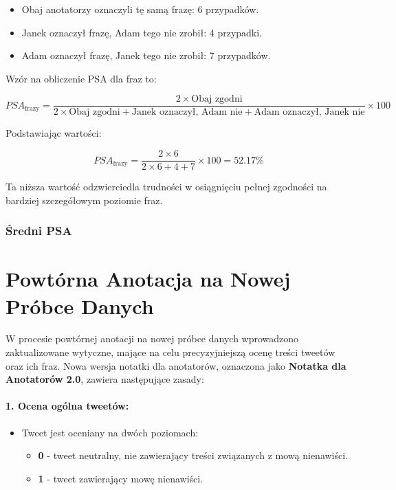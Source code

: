 \documentclass[12pt]{article}
\begin{document}
\begin{itemize}
    \item Obaj anotatorzy oznaczyli tę samą frazę: 6 przypadków.
    \item Janek oznaczył frazę, Adam tego nie zrobił: 4 przypadki.
    \item Adam oznaczył frazę, Janek tego nie zrobił: 7 przypadków.
\end{itemize}

Wzór na obliczenie PSA dla fraz to:

\begin{dmath}
PSA_{\text{frazy}} = \frac{2 \times \text{Obaj zgodni}}{2 \times \text{Obaj zgodni} + \text{Janek oznaczył, Adam nie} + \text{Adam oznaczył, Janek nie}} \times 100
\end{dmath}

Podstawiając wartości:

\begin{dmath}
PSA_{\text{frazy}} = \frac{2 \times 6}{2 \times 6 + 4 + 7} \times 100 = 52.17\%
\end{dmath}

Ta niższa wartość odzwierciedla trudności w osiągnięciu pełnej zgodności na bardziej szczegółowym poziomie fraz.

\subsubsection{Średni PSA}

\section{Powtórna Anotacja na Nowej Próbce Danych}

W procesie powtórnej anotacji na nowej próbce danych wprowadzono zaktualizowane wytyczne, mające na celu precyzyjniejszą ocenę treści tweetów oraz ich fraz. Nowa wersja notatki dla anotatorów, oznaczona jako \textbf{Notatka dla Anotatorów 2.0}, zawiera następujące zasady:

\paragraph{1. Ocena ogólna tweetów:}
\begin{itemize}
    \item Tweet jest oceniany na dwóch poziomach:
    \begin{itemize}
        \item \textbf{0} - tweet neutralny, nie zawierający treści związanych z mową nienawiści.
        \item \textbf{1} - tweet zawierający mowę nienawiści.
    \end{itemize}
\end{itemize}
\end{document}
